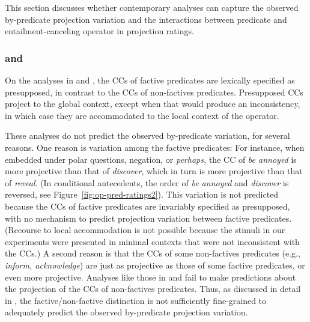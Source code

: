 \documentclass[a4paper,12pt,twoside]{article}
\begin{document}
    This section discusses whether contemporary analyses can capture the observed by-predicate projection variation and the interactions between predicate and entailment-canceling operator in projection ratings. 

\subsubsection{\citealt{heim_projection_1983} and \citealt{van_der_sandt_presupposition_1992}}\label{s:heim}

    On the analyses in \citealt{heim_projection_1983} and \citealt{van_der_sandt_presupposition_1992}, the CCs of factive predicates are lexically specified as presupposed, in contrast to the CCs of non-factives predicates. Presupposed CCs project to the global context, except when that would produce an inconsistency, in which case they are accommodated to the local context of the operator.

    These analyses do not predict the observed by-predicate variation, for several reasons. One reason is  variation among the factive predicates: For instance, when embedded under polar questions, negation, or \emph{perhaps,} the CC of \emph{be annoyed} is more projective than that of \emph{discover}, which in turn is more projective than that of \emph{reveal}. (In conditional antecedents, the order of \emph{be annoyed} and \emph{discover} is reversed, see Figure~\ref{fig:op-pred-ratings2}).
    This variation is not predicted because the CCs of factive predicates are invariably specified as presupposed, with no mechanism to predict projection variation between factive predicates. (Recourse to local accommodation is not possible because the stimuli in our experiments were presented in minimal contexts that were not inconsistent with the CCs.)  A second reason is that the CCs of some non-factives predicates (e.g., \emph{inform, acknowledge}) are just as projective as those of some factive predicates, or even more projective. Analyses like those in \citealt{heim_projection_1983} and \citealt{van_der_sandt_presupposition_1992} fail to make predictions about the projection of the CCs of non-factives predicates. Thus, as discussed in detail in \citealt{degen_are_2022}, the factive/non-factive distinction is not sufficiently fine-grained to adequately predict the observed by-predicate projection variation.
\end{document}
